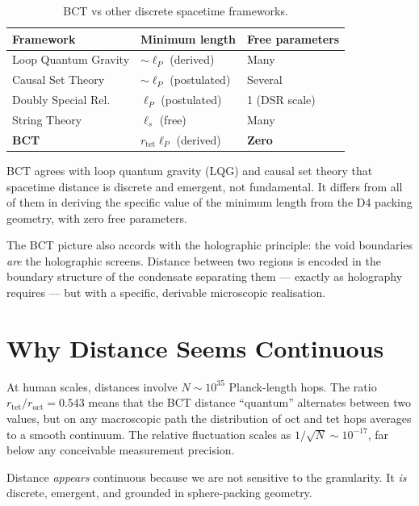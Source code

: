 \documentclass[aps,prl,twocolumn,showpacs,preprintnumbers]{revtex4-2}
\newcommand{\roct}{r_{\mathrm{oct}}}
\newcommand{\rtet}{r_{\mathrm{tet}}}
\newcommand{\lP}{\ell_P}
\begin{document}
\begin{table}[h]
\centering
\caption{BCT vs other discrete spacetime frameworks.}
\label{tab:compare}
\begin{tabular}{lll}
\toprule
Framework & Minimum length & Free parameters \\
\midrule
Loop Quantum Gravity  & $\sim\lP$ (derived)    & Many \\
Causal Set Theory     & $\sim\lP$ (postulated) & Several \\
Doubly Special Rel.   & $\lP$ (postulated)     & 1 (DSR scale) \\
String Theory         & $\ell_s$ (free)        & Many \\
\textbf{BCT}          & $\rtet\lP$ (derived)   & \textbf{Zero} \\
\bottomrule
\end{tabular}
\end{table}

BCT agrees with loop quantum gravity (LQG) and causal set theory
that spacetime distance is discrete and emergent, not fundamental.
It differs from all of them in deriving the specific value of the
minimum length from the D4 packing geometry, with zero free
parameters.

The BCT picture also accords with the holographic principle:
the void boundaries \emph{are} the holographic screens. Distance
between two regions is encoded in the boundary structure of the
condensate separating them --- exactly as holography requires ---
but with a specific, derivable microscopic realisation.

\section{Why Distance Seems Continuous}

At human scales, distances involve $N \sim 10^{35}$ Planck-length
hops. The ratio $\rtet/\roct = 0.543$ means that the BCT distance
``quantum'' alternates between two values, but on any macroscopic
path the distribution of oct and tet hops averages to a smooth
continuum. The relative fluctuation scales as $1/\sqrt{N} \sim
10^{-17}$, far below any conceivable measurement precision.

Distance \emph{appears} continuous because we are not sensitive
to the granularity. It \emph{is} discrete, emergent, and grounded
in sphere-packing geometry.
\end{document}
